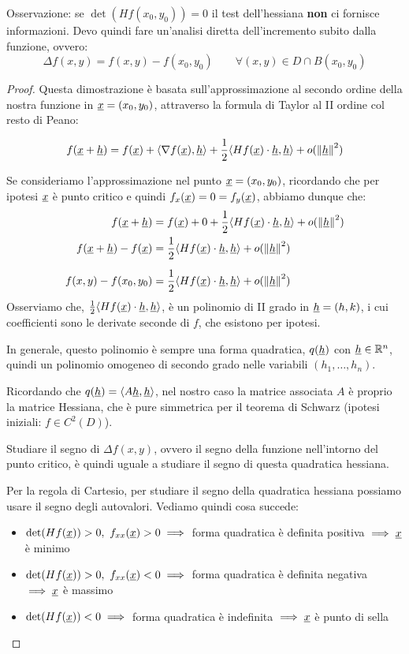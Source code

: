Osservazione: se \(\det(Hf(x_0,y_0)) =0\) il test dell'hessiana \textbf{non} ci fornisce informazioni. Devo quindi fare un'analisi diretta dell'incremento subito dalla funzione, ovvero:
\[
    \Delta f(x,y) = f(x,y)-f(x_0,y_0) \qquad \forall (x,y) \in D \cap B(x_0,y_0)
\]

\begin{proof}
    Questa dimostrazione è basata sull'approssimazione al secondo ordine della nostra funzione in \(\underline{x} = (x_0, y_0)\), attraverso la formula di Taylor al II ordine col resto di Peano:

    \[
        f(\underline{x} + \underline{h} ) = f(\underline{x} ) + \langle \nabla f(\underline{x} ),\underline{h}\rangle + \frac{1}{2} \langle Hf(\underline{x} ) \cdot \underline{h},\underline{h}\rangle + o(\left\lVert\underline{h}\right\rVert^{2})
    \]

    Se consideriamo l'approssimazione nel punto \(\underline{x} = (x_0,y_0)\), ricordando che per ipotesi \(\underline{x} \) è punto critico e quindi \(f_x(\underline{x})=0=f_y(\underline{x})\), abbiamo dunque che:
    \begin{align*}
        f(\underline{x} + \underline{h})          & = f(\underline{x}) + 0 + \frac{1}{2} \langle Hf(\underline{x} ) \cdot \underline{h},\underline{h}\rangle + o({\left\lVert\underline{h}\right\rVert}^2) \\
        f(\underline{x} + \underline{h}) - f(\underline{x}) & = \frac{1}{2} \langle Hf(\underline{x} ) \cdot \underline{h},\underline{h}\rangle + o({\left\lVert\underline{h}\right\rVert}^2)              \\[2mm]
        f(x,y) - f(x_0,y_0)   & = \frac{1}{2} \langle Hf(\underline{x} ) \cdot \underline{h},\underline{h}\rangle + o({\left\lVert\underline{h}\right\rVert}^2)
    \end{align*}
    Osserviamo che, \(\frac{1}{2} \langle Hf(\underline{x} ) \cdot \underline{h},\underline{h}\rangle\), è un polinomio di II grado in \(\underline{h}=(h,k)\), i cui coefficienti sono le derivate seconde di \(f\), che esistono per ipotesi.

    In generale, questo polinomio è sempre una forma quadratica, \(q(\underline{h})\) con {\(\underline{h} \in \mathbb{R}^{n} \)}, quindi un polinomio omogeneo di secondo grado nelle variabili \((h_1,\ldots,h_n)\).

    Ricordando che \(q(\underline{h}) = \langle A\underline{h},\underline{h}\rangle\), nel nostro caso la matrice associata \(A\) è proprio la matrice Hessiana, che è pure simmetrica per il teorema di Schwarz (ipotesi iniziali: \(f \in C^{2}(D)\)).

    Studiare il segno di \(\Delta f(x,y)\), ovvero il segno della funzione nell'intorno del punto critico, è quindi uguale a studiare il segno di questa quadratica hessiana.

    Per la regola di Cartesio, per studiare il segno della quadratica hessiana possiamo usare il segno degli autovalori. Vediamo quindi cosa succede:

    \begin{itemize}
        \item \(\det(Hf(\underline{x}))>0,\ f_{xx}(\underline{x})>0 \implies \) forma quadratica è definita positiva \(\implies \underline{x} \) è minimo
        \item \(\det(Hf(\underline{x}))>0,\ f_{xx}(\underline{x})<0 \implies \) forma quadratica è definita negativa \(\implies \underline{x} \) è massimo
        \item \(\det(Hf(\underline{x}))<0 \implies \) forma quadratica è indefinita \(\implies \underline{x} \) è punto di sella
    \end{itemize}

\end{proof}


